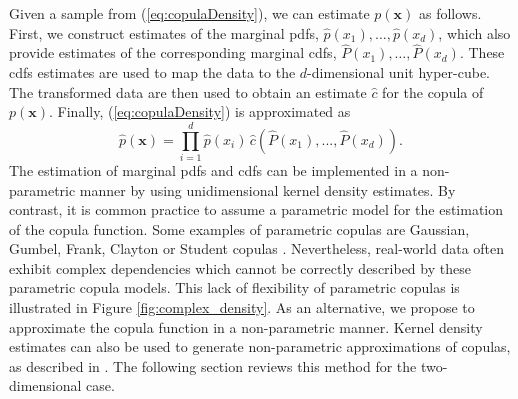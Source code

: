 \documentclass{article}
\begin{document}
Given a sample from (\ref{eq:copulaDensity}), we can estimate $p(\mathbf{x})$
as follows. First, we construct estimates of the marginal pdfs,
$\hat{p}(x_1),\ldots,\hat{p}(x_d)$, which also provide estimates of the
corresponding marginal cdfs, $\hat{P}(x_1),\ldots,\hat{P}(x_d)$. These cdfs
estimates are used to map the data to the $d$-dimensional unit hyper-cube. The
transformed data are then used to obtain an estimate $\hat{c}$ for the copula
of $p(\mathbf{x})$.  Finally, (\ref{eq:copulaDensity}) is approximated as
\begin{equation}
\hat{p}(\mathbf{x}) = \prod_{i=1}^{d} \hat{p}(x_i) \, \hat{c}(\hat{P}(x_1),...,
\hat{P}(x_d)).\label{eq:copulaApprox}
\end{equation}
The estimation of marginal pdfs and cdfs can be implemented in a non-parametric
manner by using unidimensional kernel density estimates. By contrast, it is
common practice to assume a parametric model for the estimation of the copula
function.  Some examples of parametric copulas are Gaussian, Gumbel, Frank,
Clayton or Student copulas \cite{nelsen}.  Nevertheless, real-world data often
exhibit complex dependencies which cannot be correctly described by these
parametric copula models. This lack of flexibility of parametric copulas is
illustrated in Figure \ref{fig:complex_density}.  As an alternative, we propose
to approximate the copula function in a non-parametric manner.  Kernel density
estimates can also be used to generate non-parametric approximations of
copulas, as described in \cite{kernel_copula}. The following section reviews
this method for the two-dimensional case.
\end{document}
